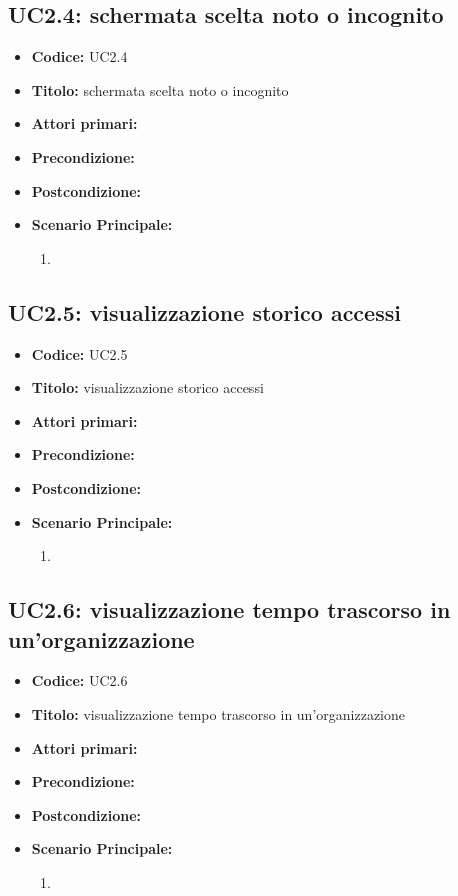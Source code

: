 ﻿\documentclass[../analisi-dei-requisiti]{subfiles}
\begin{document}
\subsection{UC2.4: schermata scelta noto o incognito}
\label{sub:uc2.1utente}
\begin{itemize}
  \item \textbf{Codice:} UC2.4
  \item \textbf{Titolo:} schermata scelta noto o incognito
  \item \textbf{Attori primari:}
  \item \textbf{Precondizione:}
  \item \textbf{Postcondizione:}
  \item \textbf{Scenario Principale:}
  \begin{enumerate}
    \item
  \end{enumerate}
\end{itemize}

\subsection{UC2.5: visualizzazione storico accessi}
\label{sub:uc2.1utente}
\begin{itemize}
  \item \textbf{Codice:} UC2.5
  \item \textbf{Titolo:} visualizzazione storico accessi
  \item \textbf{Attori primari:}
  \item \textbf{Precondizione:}
  \item \textbf{Postcondizione:}
  \item \textbf{Scenario Principale:}
  \begin{enumerate}
    \item
  \end{enumerate}
\end{itemize}

\subsection{UC2.6: visualizzazione tempo trascorso in un'organizzazione}
\label{sub:uc2.1utente}
\begin{itemize}
  \item \textbf{Codice:} UC2.6
  \item \textbf{Titolo:} visualizzazione tempo trascorso in un'organizzazione
  \item \textbf{Attori primari:}
  \item \textbf{Precondizione:}
  \item \textbf{Postcondizione:}
  \item \textbf{Scenario Principale:}
  \begin{enumerate}
    \item
  \end{enumerate}
\end{itemize}
\end{document}

